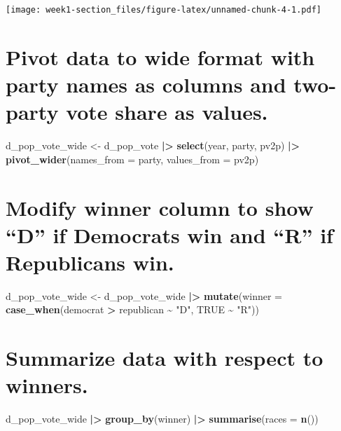 \documentclass[
]{article}
\newenvironment{Shaded}{\begin{snugshade}}{\end{snugshade}}
\newcommand{\AttributeTok}[1]{\textcolor[rgb]{0.13,0.29,0.53}{#1}}
\newcommand{\ConstantTok}[1]{\textcolor[rgb]{0.56,0.35,0.01}{#1}}
\newcommand{\FunctionTok}[1]{\textcolor[rgb]{0.13,0.29,0.53}{\textbf{#1}}}
\newcommand{\NormalTok}[1]{#1}
\newcommand{\OtherTok}[1]{\textcolor[rgb]{0.56,0.35,0.01}{#1}}
\newcommand{\SpecialCharTok}[1]{\textcolor[rgb]{0.81,0.36,0.00}{\textbf{#1}}}
\newcommand{\StringTok}[1]{\textcolor[rgb]{0.31,0.60,0.02}{#1}}
\begin{document}
\texttt{[image: week1-section\_files/figure-latex/unnamed-chunk-4-1.pdf]}

\section{Pivot data to wide format with party names as columns and
two-party vote share as
values.}\label{pivot-data-to-wide-format-with-party-names-as-columns-and-two-party-vote-share-as-values.}

\begin{Shaded}
\begin{Highlighting}[]
\NormalTok{d\_pop\_vote\_wide }\OtherTok{\textless{}{-}}\NormalTok{ d\_pop\_vote }\SpecialCharTok{|\textgreater{}}
    \FunctionTok{select}\NormalTok{(year, party, pv2p) }\SpecialCharTok{|\textgreater{}}
    \FunctionTok{pivot\_wider}\NormalTok{(}\AttributeTok{names\_from =}\NormalTok{ party, }\AttributeTok{values\_from =}\NormalTok{ pv2p)}
\end{Highlighting}
\end{Shaded}

\section{Modify winner column to show ``D'' if Democrats win and ``R''
if Republicans
win.}\label{modify-winner-column-to-show-d-if-democrats-win-and-r-if-republicans-win.}

\begin{Shaded}
\begin{Highlighting}[]
\NormalTok{d\_pop\_vote\_wide }\OtherTok{\textless{}{-}}\NormalTok{ d\_pop\_vote\_wide }\SpecialCharTok{|\textgreater{}} 
    \FunctionTok{mutate}\NormalTok{(}\AttributeTok{winner =} \FunctionTok{case\_when}\NormalTok{(democrat }\SpecialCharTok{\textgreater{}}\NormalTok{ republican }\SpecialCharTok{\textasciitilde{}} \StringTok{"D"}\NormalTok{,}
                              \ConstantTok{TRUE} \SpecialCharTok{\textasciitilde{}} \StringTok{"R"}\NormalTok{))}
\end{Highlighting}
\end{Shaded}

\section{Summarize data with respect to
winners.}\label{summarize-data-with-respect-to-winners.}

\begin{Shaded}
\begin{Highlighting}[]
\NormalTok{d\_pop\_vote\_wide }\SpecialCharTok{|\textgreater{}} 
  \FunctionTok{group\_by}\NormalTok{(winner) }\SpecialCharTok{|\textgreater{}}
  \FunctionTok{summarise}\NormalTok{(}\AttributeTok{races =} \FunctionTok{n}\NormalTok{())}
\end{Highlighting}
\end{Shaded}
\end{document}
